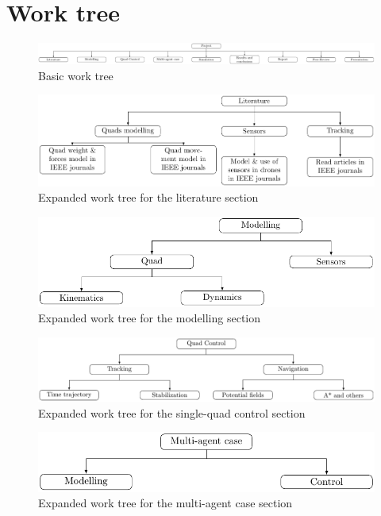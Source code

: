\documentclass{article}
\begin{document}
	\section{Work tree}
		\begin{figure}[H]
				\centering
				\includegraphics[width=\linewidth]{Workplan_work_tree/basic_work_tree_diagram}
				\caption{Basic work tree}
		\end{figure}
		\begin{figure}[H]
			\centering
			\includegraphics[width=.8\linewidth]{Workplan_work_tree/literature_work_tree_diagram}
			\caption{Expanded work tree for the literature section}
		\end{figure}
		\begin{figure}[H]
			\centering
			\includegraphics[width=.8\linewidth]{Workplan_work_tree/modelling_work_tree_diagram}
			\caption{Expanded work tree for the modelling section}
		\end{figure}
		\begin{figure}[H]
			\centering
			\includegraphics[width=.8\linewidth]{Workplan_work_tree/control_work_tree_diagram}
			\caption{Expanded work tree for the single-quad control section}
		\end{figure}
		\begin{figure}[H]
			\centering
			\includegraphics[width=.8\linewidth]{Workplan_work_tree/multiagent_work_tree_diagram}
			\caption{Expanded work tree for the multi-agent case section}
		\end{figure}
\end{document}

